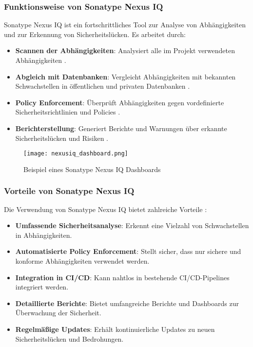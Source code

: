 \subsubsection{Funktionsweise von Sonatype Nexus IQ}

Sonatype Nexus IQ ist ein fortschrittliches Tool zur Analyse von Abhängigkeiten und zur Erkennung von Sicherheitslücken. Es arbeitet durch:

\begin{itemize}
    \item \textbf{Scannen der Abhängigkeiten}: Analysiert alle im Projekt verwendeten Abhängigkeiten \cite{Sonatype2020}.
    \item \textbf{Abgleich mit Datenbanken}: Vergleicht Abhängigkeiten mit bekannten Schwachstellen in öffentlichen und privaten Datenbanken \cite{Sonatype2020}.
    \item \textbf{Policy Enforcement}: Überprüft Abhängigkeiten gegen vordefinierte Sicherheitsrichtlinien und Policies \cite{Sonatype2020}.
    \item \textbf{Berichterstellung}: Generiert Berichte und Warnungen über erkannte Sicherheitslücken und Risiken \cite{Sonatype2020}.
\end{itemize}

\begin{figure*}[h!]
\centering
\texttt{[image: nexusiq\_dashboard.png]}
\caption{Beispiel eines Sonatype Nexus IQ Dashboards}
\label{fig:nexusiq_dashboard}
\end{figure*}

\subsubsection{Vorteile von Sonatype Nexus IQ}

Die Verwendung von Sonatype Nexus IQ bietet zahlreiche Vorteile \cite{Sonatype2020}:

\begin{itemize}
    \item \textbf{Umfassende Sicherheitsanalyse}: Erkennt eine Vielzahl von Schwachstellen in Abhängigkeiten.
    \item \textbf{Automatisierte Policy Enforcement}: Stellt sicher, dass nur sichere und konforme Abhängigkeiten verwendet werden.
    \item \textbf{Integration in CI/CD}: Kann nahtlos in bestehende CI/CD-Pipelines integriert werden.
    \item \textbf{Detaillierte Berichte}: Bietet umfangreiche Berichte und Dashboards zur Überwachung der Sicherheit.
    \item \textbf{Regelmäßige Updates}: Erhält kontinuierliche Updates zu neuen Sicherheitslücken und Bedrohungen.
\end{itemize}

